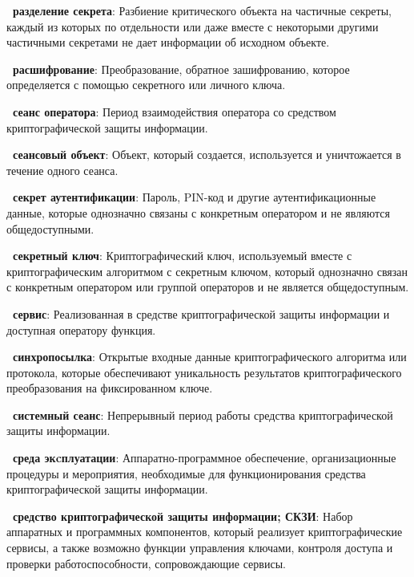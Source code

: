 {\bf \thedefctr~разделение секрета}:
Разбиение критического объекта на частичные секреты, 
каждый из которых по отдельности или даже вместе с некоторыми
другими частичными секретами не дает информации об исходном объекте.

{\bf \thedefctr~расшифрование}:
Преобразование, обратное зашифрованию, которое определяется с помощью
секретного или личного ключа.


{\bf \thedefctr~сеанс оператора}:
Период взаимодействия оператора со средством криптографической
защиты информации.

{\bf \thedefctr~сеансовый объект}:
Объект, который создается, 
используется и уничтожается в течение одного сеанса.

{\bf \thedefctr~секрет аутентификации}:
Пароль, PIN-код и другие аутентификационные данные, 
которые однозначно связаны с конкретным оператором 
и не являются общедоступными.

{\bf \thedefctr~секретный ключ}:
Криптографический ключ, используемый
вместе с криптографическим алгоритмом с секретным ключом, 
который однозначно связан с конкретным оператором 
или группой операторов и не является общедоступным.


{\bf \thedefctr~сервис}:
Реализованная в средстве криптографической защиты информации 
и доступная оператору функция.

{\bf \thedefctr~синхропосылка}:
Открытые входные данные криптографического алгоритма или протокола,
которые обеспечивают уникальность результатов 
криптографического преобразования на фиксированном ключе.


{\bf \thedefctr~системный сеанс}:
Непрерывный период работы средства криптографической защиты информации.

{\bf \thedefctr~среда экcплуатации}:
Аппаратно-программное обеспечение, организационные процедуры и мероприятия,
необходимые для функционирования средства криптографической защиты
информации.

{\bf \thedefctr~средство криптографической защиты информации; СКЗИ}:
Набор аппаратных и программных компонентов, который реализует
криптографические сервисы, а также возможно функции управления ключами,
контроля доступа и проверки работоспособности, сопровождающие сервисы.


